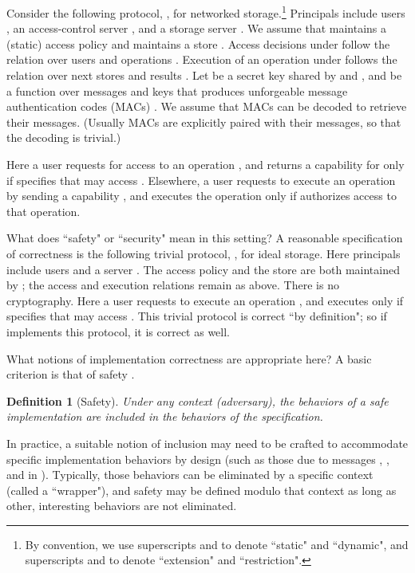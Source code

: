 \documentclass[10pt]{article}
\newtheorem{definition}{Definition}
\begin{document}
Consider the following protocol, , for networked storage.\footnote{By convention, we use superscripts  and  to denote ``static" and ``dynamic", and superscripts  and  to denote ``extension" and ``restriction".} Principals include users , an access-control server , and a storage server . We assume that  maintains a (static) access policy  and  maintains a store . Access decisions under  follow the relation  over users  and operations . Execution of an operation  under  follows the relation  over next stores  and results . Let  be a secret key shared by  and , and  be a function over messages and keys that produces unforgeable message authentication codes (MACs) \cite{lecnotes}. We assume that MACs can be decoded to retrieve their messages. (Usually MACs are explicitly paired with their messages, so that the decoding is trivial.)

Here a user  requests  for access to an operation , and  returns a capability for  only if  specifies that  may access . Elsewhere, a user  requests  to execute an operation by sending a capability , and  executes the operation only if  authorizes access to that operation.

What does ``safety" or ``security" mean in this setting? A reasonable specification of correctness is the following trivial protocol, , for ideal storage. Here principals include users  and a server . The access policy  and the store  are both maintained by ; the access and execution relations remain as above. There is no cryptography. 
Here a user  requests  to execute an operation , and  executes  only if  specifies that  may access . This trivial protocol is correct ``by definition"; so if  implements this protocol, it is correct as well. 

What notions of implementation correctness are appropriate here? A basic criterion is that of safety \cite{refmap}. 
\begin{definition}[Safety]
Under any context (adversary), the behaviors of a safe implementation are included in the behaviors of the specification.
\end{definition}
\noindent
In practice, a suitable notion of inclusion may need to be crafted to accommodate specific implementation behaviors by design (such as those due to messages , , and  in ). Typically, those behaviors can be eliminated by a specific context (called a ``wrapper"), and safety may be defined modulo that context as long as other, interesting behaviors are not eliminated. 
\end{document}
